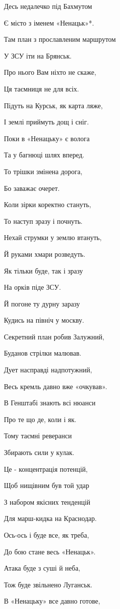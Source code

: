 Десь недалечко під Бахмутом\par
Є місто з іменем «Ненацьк»*. \par
Там план з прославленим маршрутом\par
У ЗСУ іти на Брянськ. \par
Про нього Вам ніхто не скаже,\par
Ця таємниця не для всіх.\par
Підуть на Курськ, як карта ляже,\par
І землі приймуть дощ і сніг.\par
Поки в «Ненацьку» є волога\par
Та у багнюці шлях вперед.\par
То трішки змінена дорога,\par
Бо заважає очерет.\par
Коли зірки коректно стануть,\par
То наступ зразу і почнуть.\par
Нехай струмки у землю втануть,\par
Й руками хмари розведуть. \par
Як тільки буде, так і зразу \par
На орків піде ЗСУ.\par
Й погоне ту дурну заразу\par
Кудись на північ у москву.\par
Секретний план робив Залужний,\par
Буданов стрілки малював.\par
Дует насправді надпотужний,\par
Весь кремль давно вже «очкував».\par
В Генштабі знають всі нюанси \par
Про те що де, коли і як.\par
Тому таємні реверанси\par
Збирають сили у кулак.\par
Це - концентрація потенцій,\par
Щоб нищівним був той удар\par
З набором якісних тенденцій \par
Для марш-кидка на Краснодар.\par
Ось-ось і буде все, як треба,\par
До бою стане весь «Ненацьк». \par
Атака буде з суші й неба,\par
Тож буде звільнено Луганськ.\par
В «Ненацьку» все давно готове,\par
